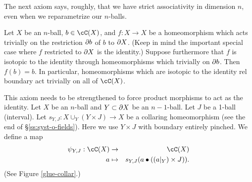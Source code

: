The next axiom says, roughly, that we have strict associativity in dimension $n$, 
even when we reparametrize our $n$-balls.

\begin{axiom}
Let $X$ be an $n$-ball, $b \in \cC(X)$, and $f: X\to X$ be a homeomorphism which 
acts trivially on the restriction $\partial b$ of $b$ to $\partial X$.
(Keep in mind the important special case where $f$ restricted to $\partial X$ is the identity.)
Suppose furthermore that $f$ is isotopic to the identity through homeomorphisms which
trivially on $\partial b$.
Then $f(b) = b$.
In particular, homeomorphisms which are isotopic to the identity rel boundary act trivially on 
all of $\cC(X)$.
\end{axiom}

This axiom needs to be strengthened to force product morphisms to act as the identity.
Let $X$ be an $n$-ball and $Y\subset\partial X$ be an $n{-}1$-ball.
Let $J$ be a 1-ball (interval).
Let $s_{Y,J}: X\cup_Y (Y\times J) \to X$ be a collaring homeomorphism
(see the end of \S\ref{ss:syst-o-fields}).
Here we use $Y\times J$ with boundary entirely pinched.
We define a map
\begin{eqnarray*}
	\psi_{Y,J}: \cC(X) &\to& \cC(X) \\
	a & \mapsto & s_{Y,J}(a \bullet ((a|_Y)\times J)) .
\end{eqnarray*}
(See Figure \ref{glue-collar}.)
